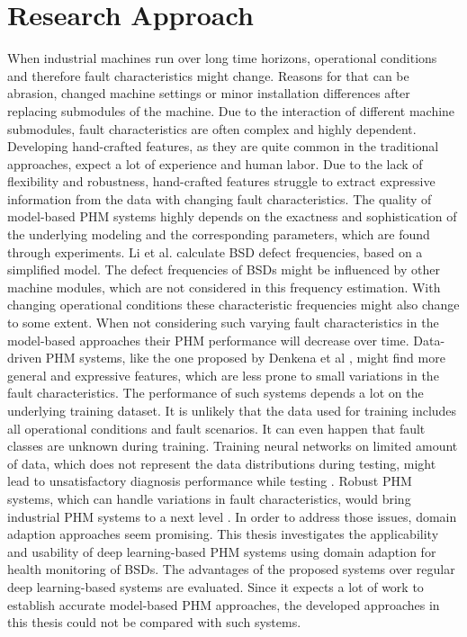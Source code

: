 \chapter{Research Approach}\label{chapter:research_approach}

When industrial machines run over long time horizons, operational conditions and therefore fault characteristics might change. Reasons for that can be abrasion, changed machine settings or minor installation differences after replacing submodules of the machine. Due to the interaction of different machine submodules, fault characteristics are often complex and highly dependent. Developing hand-crafted features, as they are quite common in the traditional approaches, expect a lot of experience and human labor. Due to the lack of flexibility and robustness, hand-crafted features struggle to extract expressive information from the data with changing fault characteristics. The quality of model-based PHM systems highly depends on the exactness and sophistication of the underlying modeling and the corresponding parameters, which are found through experiments. Li et al. \cite{Lee2015} calculate BSD defect frequencies, based on a simplified model. The defect frequencies of BSDs might be influenced by other machine modules, which are not considered in this frequency estimation. With changing operational conditions these characteristic frequencies might also change to some extent. When not considering such varying fault characteristics in the model-based approaches their PHM performance will decrease over time. Data-driven PHM systems, like the one proposed by Denkena et al \cite{Denkena2021}, might find more general and expressive features, which are less prone to small variations in the fault characteristics. The performance of such systems depends a lot on the underlying training dataset. It is unlikely that the data used for training includes all operational conditions and fault scenarios. It can even happen that fault classes are unknown during training. Training neural networks on limited amount of data, which does not represent the data distributions during testing, might lead to unsatisfactory diagnosis performance while testing \cite{AZAMFAR2020103932}. Robust PHM systems, which can handle variations in fault characteristics, would bring industrial PHM systems to a next level \cite{Michau2017}. In order to address those issues, domain adaption approaches seem promising. This thesis investigates the applicability and usability of deep learning-based PHM systems using domain adaption for health monitoring of BSDs. The advantages of the proposed systems over regular deep learning-based systems are evaluated. Since it expects a lot of work to establish accurate model-based PHM approaches, the developed approaches in this thesis could not be compared with such systems.

